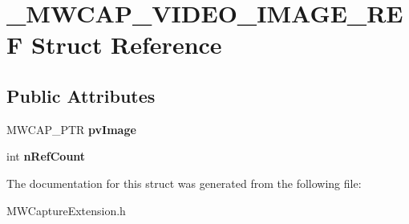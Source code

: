 \hypertarget{struct__MWCAP__VIDEO__IMAGE__REF}{\section{\-\_\-\-M\-W\-C\-A\-P\-\_\-\-V\-I\-D\-E\-O\-\_\-\-I\-M\-A\-G\-E\-\_\-\-R\-E\-F Struct Reference}
\label{struct__MWCAP__VIDEO__IMAGE__REF}
}
\subsection*{Public Attributes}
\begin{DoxyCompactItemize}
\item 
\hypertarget{struct__MWCAP__VIDEO__IMAGE__REF_a76fc6bdc02c193d3ab4b18ce9de3b4c0}{M\-W\-C\-A\-P\-\_\-\-P\-T\-R {\bfseries pv\-Image}}\label{struct__MWCAP__VIDEO__IMAGE__REF_a76fc6bdc02c193d3ab4b18ce9de3b4c0}

\item 
\hypertarget{struct__MWCAP__VIDEO__IMAGE__REF_a2e5d73248b03d864c925a0b8c7de4ce6}{int {\bfseries n\-Ref\-Count}}\label{struct__MWCAP__VIDEO__IMAGE__REF_a2e5d73248b03d864c925a0b8c7de4ce6}

\end{DoxyCompactItemize}


The documentation for this struct was generated from the following file\-:\begin{DoxyCompactItemize}
\item 
M\-W\-Capture\-Extension.\-h\end{DoxyCompactItemize}
